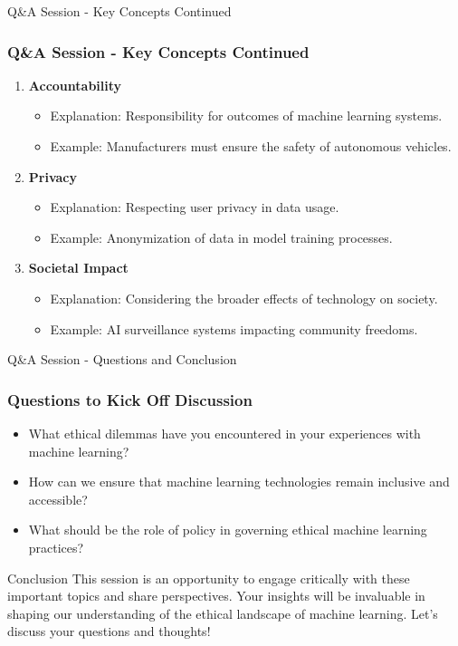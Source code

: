 \documentclass[aspectratio=169]{beamer}
\begin{document}
\begin{frame}[fragile]{Q\&A Session - Key Concepts Continued}
  \frametitle{Q\&A Session - Key Concepts Continued}
  \begin{enumerate}[resume] %
    \item \textbf{Accountability}
      \begin{itemize}
        \item Explanation: Responsibility for outcomes of machine learning systems.
        \item Example: Manufacturers must ensure the safety of autonomous vehicles.
      \end{itemize}

    \item \textbf{Privacy}
      \begin{itemize}
        \item Explanation: Respecting user privacy in data usage.
        \item Example: Anonymization of data in model training processes.
      \end{itemize}

    \item \textbf{Societal Impact}
      \begin{itemize}
        \item Explanation: Considering the broader effects of technology on society.
        \item Example: AI surveillance systems impacting community freedoms.
      \end{itemize}
  \end{enumerate}
\end{frame}

\begin{frame}[fragile]{Q\&A Session - Questions and Conclusion}
  \frametitle{Questions to Kick Off Discussion}
  \begin{itemize}
    \item What ethical dilemmas have you encountered in your experiences with machine learning?
    \item How can we ensure that machine learning technologies remain inclusive and accessible?
    \item What should be the role of policy in governing ethical machine learning practices?
  \end{itemize}
  \begin{block}{Conclusion}
    This session is an opportunity to engage critically with these important topics and share perspectives. Your insights will be invaluable in shaping our understanding of the ethical landscape of machine learning. Let’s discuss your questions and thoughts!
  \end{block}
\end{frame}
\end{document}
